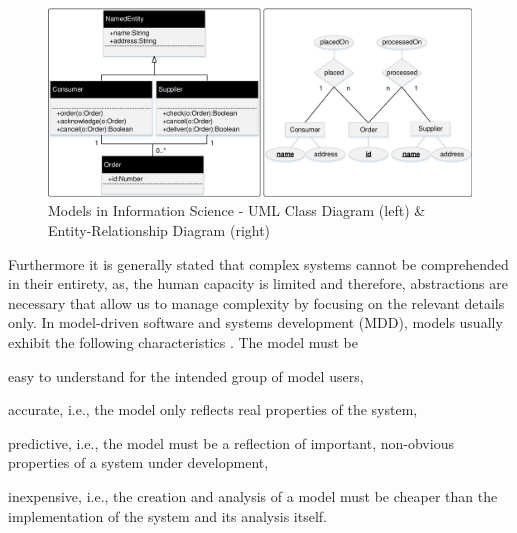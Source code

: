 \begin{figure}[!tb]
\begin{center}
\includegraphics[width=\textwidth]{img/gen_intro/models2.pdf}
\end{center}
\caption{Models in Information Science - UML Class Diagram (left) \& Entity-Relationship Diagram (right)}
\label{fig:sec-gen-intro-models:models2}
\end{figure}

Furthermore it is generally stated that complex systems cannot be comprehended in their entirety, as, the human capacity is limited and therefore, abstractions are necessary that allow us to manage complexity \cite{Quatrani:1998:VMR:275580} by focusing on the relevant details only.
In model-driven software and systems development (MDD), models usually exhibit the following characteristics \cite{Selic:2003:PMD:942589.942714}.
The model must be
{
\renewcommand\labelenumi{(\theenumi)}
\begin{enumerate*}
\item easy to understand for the intended group of model users,
\item accurate, i.e., the model only reflects real properties of the system,
\item predictive, i.e., the model must be a reflection of important, non-obvious properties of a system under development,
\item inexpensive, i.e., the creation and analysis of a model must be cheaper than the implementation of the system and its analysis itself.
\end{enumerate*}
}

